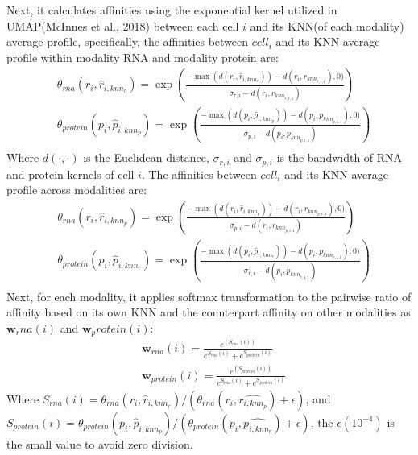 Next, it calculates affinities using the exponential kernel utilized in UMAP(McInnes et al., 2018) between each cell $i$ and its KNN(of each modality) average profile, specifically, the affinities between $cell_i$ and its KNN average profile within modality RNA and modality protein are:
\begin{equation}
	\begin{aligned}
		& \theta_{rna}\left(r_i,\hat{r}_{i, knn_r}\right) = \exp\left( \frac{-\max(d(r_i, \hat{r}_{i,knn_r}))-d(r_i, r_{knn_{r,i,1}}), 0)}{\sigma_{r,i} - d(r_i,r_{knn_{r,i,1}})}\right)\\
		& \theta_{protein}\left(p_i,\hat{p}_{i, knn_p}\right) = \exp\left( \frac{-\max(d(p_i, \hat{p}_{i,knn_p}))-d(p_i, p_{knn_{p,i,1}}), 0)}{\sigma_{p,i} - d(p_i,p_{knn_{p,i,1}})}\right)\\
	\end{aligned}
\end{equation}
Where $d(\cdot,\cdot)$ is the Euclidean distance, $\sigma_{r, i}$ and $\sigma_{p, i}$ is the bandwidth of RNA and protein kernels of cell $i$. The affinities between $cell_i$ and its KNN average profile across modalities are:
\begin{equation}
	\begin{aligned}
		& \theta_{rna}\left(r_i, \hat{r}_{i,knn_p}\right) = \exp\left( \frac{-\max(d(r_i, \hat{r}_{i,knn_p}))-d(r_i, r_{knn_{p,i,1}}), 0)}{\sigma_{p,i} - d(r_i,r_{knn_{p,i,1}})}\right)\\
		& \theta_{protein}\left(p_i, \hat{p}_{i,knn_r}\right) = \exp\left( \frac{-\max(d(p_i, \hat{p}_{i,knn_r}))-d(p_i, p_{knn_{r,i,1}}), 0)}{\sigma_{r,i} - d(p_i,p_{knn_{r,j,1}})}\right)\\
	\end{aligned}
\end{equation}
Next, for each modality, it applies softmax transformation to the pairwise ratio of affinity based on its own KNN and the counterpart affinity on other modalities as $\textbf{w}_rna(i)$ and $\textbf{w}_protein(i)$:
\begin{equation}
	\begin{aligned}
	& \textbf{w}_{rna}(i)=\frac{e^{(S_{rna}(i))}}{e^{S_{rna}(i)} + e^{S_{protein}(i)}}\\
	& \textbf{w}_{protein}(i)=\frac{e^{(S_{protein}(i))}}{e^{S_{rna}(i)} + e^{S_{protein}(i)}}
	\end{aligned}
\end{equation}
Where $S_{rna}(i) = \theta_{rna}(r_i, \hat{r}_{i,knn_r})/(\theta_{rna}(r_i, \hat{r_{i,knn_p}}) + \epsilon)$, and $S_{protein}(i) = \theta_{protein}(p_i, \hat{p}_{i,knn_p})/(\theta_{protein}(p_i, \hat{p_{i,knn_r}}) + \epsilon)$, the $\epsilon(10^{-4})$ is the small value to avoid zero division.


